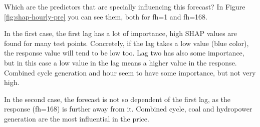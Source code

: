 Which are the predictors that are specially influencing this forecast? In Figure \ref{fig:shap-hourly-pre} you can see them, both for fh=1 and fh=168.

In the first case, the first lag has a lot of importance, high SHAP values are found for many test points. Concretely, if the lag takes a low value (blue color), the response value will tend to be low too. Lag two has also some importance, but in this case a low value in the lag means a higher value in the response. Combined cycle generation and hour seem to have some importance, but not very high.

In the second case, the forecast is not so dependent of the first lag, as the response (fh=168) is further away from it. Combined cycle, coal and hydropower generation are the most influential in the price.

